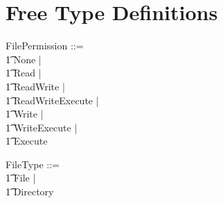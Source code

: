 \section{Free Type Definitions}

\begin{zed}
  FilePermission ::= \\
  \t1 None | \\
  \t1 Read | \\
  \t1 ReadWrite | \\
  \t1 ReadWriteExecute | \\
  \t1 Write | \\
  \t1 WriteExecute | \\
  \t1 Execute
\end{zed}

\begin{zed}
  FileType ::= \\
  \t1 File | \\
  \t1 Directory
\end{zed}

